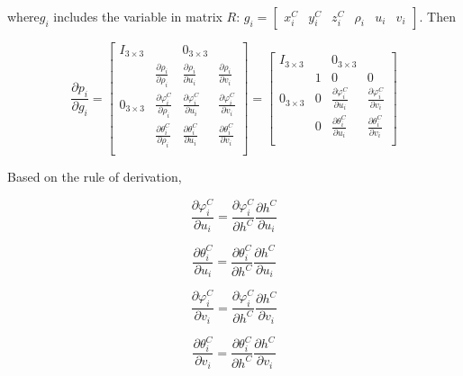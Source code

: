 \noindent where$g_{i}$ includes the variable in matrix $R$: $
g_{i}=[\begin{matrix}
x_{i}^{C} & y_{i}^{C} & z_{i}^{C} & \rho _{i} & u_{i} & v_{i}
\end{matrix}
]$. Then 

\begin{equation}
\frac{\partial p_{i}}{\partial g_{i}}=\begin{bmatrix}
I_{3\times 3} & & 0_{3\times 3} & \\
 & \frac{\partial \rho_{i}}{\partial \rho_{i}} & 
\frac{\partial \rho_{i}}{\partial u_{i}} & 
\frac{\partial \rho _{i}}{\partial v_{i}}\\
0_{3\times 3} & \frac{\partial \varphi_{i}^{C}}{\partial \rho_{i}} & 
\frac{\partial \varphi_{i}^{C}}{\partial u_{i}} & 
\frac{\partial \varphi_{i}^{C}}{\partial v_{i}} \\
 & \frac{\partial \theta_{i}^{C}}{\partial \rho_{i}} & 
\frac{\partial \theta_{i}^{C}}{\partial u_{i}} & 
\frac{\partial \theta_{i}^{C}}{\partial v_{i}} \\
\end{bmatrix} = \begin{bmatrix}
I_{3\times 3} & & 0_{3\times 3} & \\
 & 1 & 0 & 0 \\
0_{3\times 3} & 0 & \frac{\partial \varphi _{i}^{C}}{\partial u_{i}} 
& \frac{\partial \varphi_{i}^{C}}{\partial v_{i}} \\
 & 0 & \frac{\partial \theta_{i}^{C}}{\partial u_{i}} & 
\frac{\partial \theta_{i}^{C}}{\partial v_{i}} \\
\end{bmatrix}
\end{equation}

Based on the rule of derivation, 

$$\frac{\partial \varphi_{i}^{C}}{\partial u_{i}}=\frac{\partial 
\varphi_{i}^{C}}{\partial h^{C}}\frac{\partial h^{C}}{\partial u_{i}}$$


$$\frac{\partial \theta _{i}^{C}}{\partial u_{i}}=\frac{\partial \theta 
_{i}^{C}}{\partial h^{C}}\frac{\partial h^{C}}{\partial u_{i}}$$


$$\frac{\partial \varphi _{i}^{C}}{\partial v_{i}}=\frac{\partial 
\varphi _{i}^{C}}{\partial h^{C}}\frac{\partial h^{C}}{\partial v_{i}}$$

$$\frac{\partial \theta _{i}^{C}}{\partial v_{i}}=\frac{\partial \theta 
_{i}^{C}}{\partial h^{C}}\frac{\partial h^{C}}{\partial v_{i}}$$


